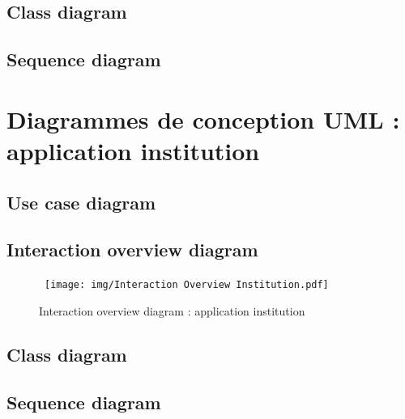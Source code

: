 \documentclass[]{report}
\begin{document}
\newpage


\subsection{Class diagram}

\newpage

\subsection{Sequence diagram}

\newpage



\section{Diagrammes de conception UML : application institution}



\subsection{Use case diagram}

\newpage

\subsection{Interaction overview diagram}



\vspace{2.5cm}
\begin{figure}[h!]
\hbox{
	\centering\texttt{[image: img/Interaction Overview Institution.pdf]}
}
\caption{Interaction overview diagram : application institution}
\end{figure}

\newpage

\subsection{Class diagram}

\newpage

\subsection{Sequence diagram}

\newpage
\end{document}
